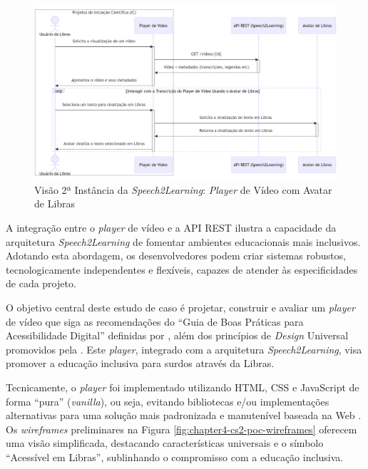 \begin{figure}[htbp]
\centering
\caption{Visão 2ª Instância da \textit{Speech2Learning}: \textit{Player} de Vídeo com Avatar de Libras}
\label{fig:chapter4-cs2-poc-diagram}
\includegraphics[width=1\textwidth]{images/chapter4-cs2-poc-diagram.png}
\fautor
\end{figure}

A integração entre o \textit{player} de vídeo e a API REST ilustra a capacidade da arquitetura \textit{Speech2Learning} de fomentar ambientes educacionais mais inclusivos. Adotando esta abordagem, os desenvolvedores podem criar sistemas robustos, tecnologicamente independentes e flexíveis, capazes de atender às especificidades de cada projeto.

O objetivo central deste estudo de caso é projetar, construir e avaliar um \textit{player} de vídeo que siga as recomendações do ``Guia de Boas Práticas para Acessibilidade Digital'' definidas por , além dos princípios de \textit{Design} Universal promovidos pela . Este \textit{player}, integrado com a arquitetura \textit{Speech2Learning}, visa promover a educação inclusiva para surdos através da Libras.

Tecnicamente, o \textit{player} foi implementado utilizando HTML, CSS e JavaScript de forma ``pura'' (\textit{vanilla}), ou seja, evitando bibliotecas e/ou implementações alternativas para uma solução mais padronizada e manutenível baseada na Web \cite{GovBr2023}. Os \textit{wireframes} preliminares na Figura \ref{fig:chapter4-cs2-poc-wireframes} oferecem uma visão simplificada, destacando características universais e o símbolo ``Acessível em Libras'', sublinhando o compromisso com a educação inclusiva.

